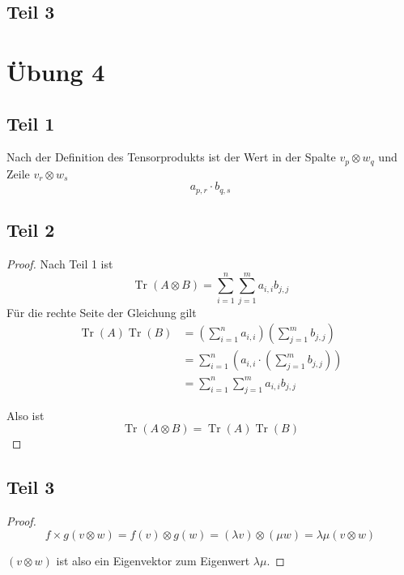 \documentclass[10pt,a4paper]{article}
\DeclareMathOperator{\Tr}{Tr}
\begin{document}
\subsection*{Teil 3}



\section*{Übung 4}

\subsection*{Teil 1}

Nach der Definition des Tensorprodukts ist der Wert in der Spalte $v_{p} \otimes w_{q}$ und Zeile $v_{r} \otimes w_{s}$
\begin{equation}
a_{p, r} \cdot b_{q, s}
\end{equation}

\subsection*{Teil 2}

\begin{proof}
Nach Teil 1 ist
\begin{equation}
\Tr(A \otimes B) = \sum_{i = 1}^{n} \sum_{j = 1}^{m} a_{i, i} b_{j, j}
\end{equation}
Für die rechte Seite der Gleichung gilt
\begin{align*}
\Tr(A)\Tr(B) & = \left( \sum_{i = 1}^{n} a_{i, i} \right) \left( \sum_{j = 1}^{m} b_{j, j} \right)\\
& = \sum_{i = 1}^{n} \left( a_{i, i} \cdot \left( \sum_{j = 1}^{m} b_{j, j} \right) \right) \\
& = \sum_{i = 1}^{n} \sum_{j = 1}^{m} a_{i, i} b_{j, j}
\end{align*}

Also ist
\begin{equation}
\Tr(A \otimes B) = \Tr(A)\Tr(B)
\end{equation}
\end{proof}

\subsection*{Teil 3}

\begin{proof}
\begin{equation}
f \times g(v \otimes w) = f(v) \otimes g(w) = (\lambda v) \otimes (\mu w) = \lambda \mu (v \otimes w)
\end{equation}

$(v \otimes w)$ ist also ein Eigenvektor zum Eigenwert $\lambda \mu$.
\end{proof}
\end{document}
